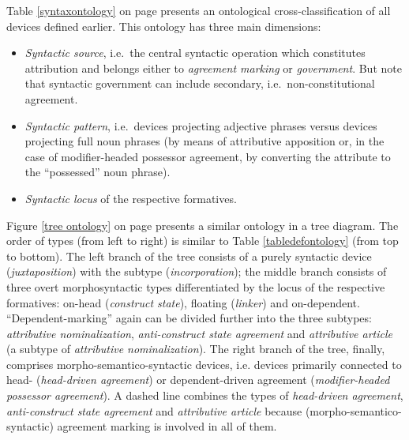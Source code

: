 Table \ref{syntaxontology} on page \pageref{syntaxontology} presents an ontological cross-classification of all devices defined earlier. This ontology has three main dimensions: 
\begin{itemize}
\item{\it Syntactic source}, i.e.~the central syntactic operation which constitutes attribution and belongs either to {\it agreement marking} or {\it government}. But note that syntactic government can include secondary, i.e.~non-constitutional agreement.
\item{\it Syntactic pattern}, i.e.~devices projecting adjective phrases versus devices projecting full noun phrases (by means of attributive apposition or, in the case of modifier-headed possessor agreement, by converting the attribute to the “possessed” noun phrase).
\item{\it Syntactic locus} of the respective formatives.
\end{itemize}
Figure \ref{tree ontology} on page \pageref{tree ontology} presents a similar ontology in a tree diagram. The order of types (from left to right) is similar to Table \ref{tabledefontology} (from top to bottom). The left branch of the tree consists of a purely syntactic device ({\it juxtaposition}) with the subtype ({\it incorporation}); the middle branch consists of three overt morphosyntactic types differentiated by the locus of the respective formatives: on-head ({\it construct state}), floating ({\it linker}) and on-dependent. “Dependent-marking” again can be divided further into the three subtypes: {\it attributive nominalization}, {\it anti-construct state agreement} and {\it attributive article} (a subtype of {\it attributive nominalization}). The right branch of the tree, finally, comprises morpho-semantico-syntactic devices, i.e. devices primarily connected to head- ({\it head-driven agreement}) or dependent-driven agreement ({\it modifier-headed possessor agreement}). A dashed line combines the types of {\it head-driven agreement}, {\it anti-construct state agreement} and {\it attributive article} because (morpho-semantico-syntactic) agreement marking is involved in all of them.

